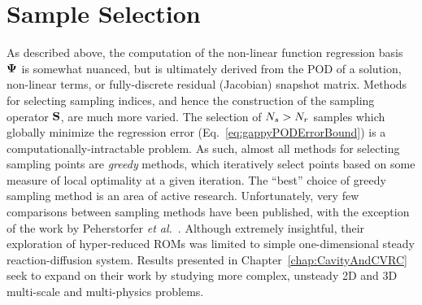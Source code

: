 \section{Sample Selection}\label{subsec:sampleSelect}

As described above, the computation of the non-linear function regression basis $\deimBasis$ is somewhat nuanced, but is ultimately derived from the POD of a solution, non-linear terms, or fully-discrete residual (Jacobian) snapshot matrix. Methods for selecting sampling indices, and hence the construction of the sampling operator $\mathbf{S}$, are much more varied. The selection of $N_s > N_r$ samples which globally minimize the regression error (Eq.~\ref{eq:gappyPODErrorBound}) is a computationally-intractable problem. As such, almost all methods for selecting sampling points are \textit{greedy} methods, which iteratively select points based on some measure of local optimality at a given iteration. The ``best'' choice of greedy sampling method is an area of active research. Unfortunately, very few comparisons between sampling methods have been published, with the exception of the work by Peherstorfer \textit{et al.}~\cite{Peherstorfer2020}. Although extremely insightful, their exploration of hyper-reduced ROMs was limited to simple one-dimensional steady reaction-diffusion system. Results presented in Chapter~\ref{chap:CavityAndCVRC} seek to expand on their work by studying more complex, unsteady 2D and 3D multi-scale and multi-physics problems.

